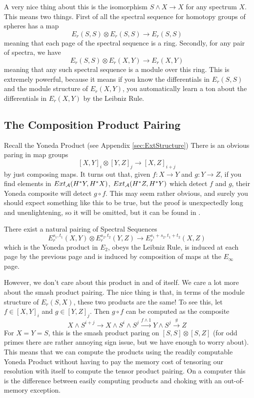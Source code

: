 A very nice thing about this is the isomorphism $S\wedge X\to X$ for any spectrum $X$.
This means two things.
First of all the spectral sequence for homotopy groups of spheres has a map
\[E_r(S,S)\otimes E_r(S,S)\to E_r(S,S)\]
meaning that each page of the spectral sequence is a ring.
Secondly, for any pair of spectra, we have
\[E_r(S,S)\otimes E_r(X,Y)\to E_r(X,Y)\]
meaning that any such spectral sequence is a module over this ring.
This is extremely powerful, because it means if you know the differentials in $E_r(S,S)$ and the module structure of $E_r(X,Y)$, you automatically learn a ton about the differentials in $E_r(X,Y)$ by the Leibniz Rule.  


\subsection{The Composition Product Pairing}
Recall the Yoneda Product (see Appendix \ref{sec:ExtStructure})
There is an obvious paring in map groups
\[[X,Y]_i\otimes [Y,Z]_j \to [X,Z]_{i+j}\]
by just composing maps.  
It turns out that, given $f:X\to Y$ and $g:Y\to Z$, if you find elements in $Ext_{\mathcal{A}}(H^*Y,H^*X)$, $Ext_{\mathcal{A}}(H^*Z,H^*Y)$ which detect $f$ and $g$, their Yoneda composite will detect $g\circ f$.  
This may seem rather obvious, and surely you should expect something like this to be true, but the proof is unexpectedly long and unenlightening, so it will be omitted, but it can be found in \cite{mossProduct}.  
\begin{Theorem}
  There exist a natural pairing of Spectral Sequences
  \[E^{s_1,t_1}_r(X,Y)\otimes E_r^{s_2,t_2}(Y,Z)\to E^{s_1+s_2,t_1+t_2}_r(X,Z)\]
  which is the Yoneda product in $E_2$, obeys the Leibniz Rule, is induced at each page by the previous page and is induced by composition of maps at the $E_\infty$ page.  
\end{Theorem}

However, we don't care about this product in and of itself.  
We care a lot more about the smash product pairing.
The nice thing is that, in terms of the module structure of $E_r(S,X)$, these two products are the same!
To see this, let $f\in [X,Y]_i$ and $g\in [Y,Z]_j$.  Then $g\circ f$ can be computed as the composite
\[X\wedge S^{i+j}\to X\wedge S^i\wedge S^j\xrightarrow{f\wedge1} Y\wedge S^j\xrightarrow{g} Z\]
For $X=Y=S$, this is the smash product paring on $[S,S]\otimes [S,Z]$ (for odd primes there are rather annoying sign issue, but we have enough to worry about).  
This means that we can compute the products using the readily computable Yoneda Product without having to pay the memory cost of tensoring our resolution with itself to compute the tensor product pairing.  
On a computer this is the difference between easily computing products and choking with an out-of-memory exception.  

